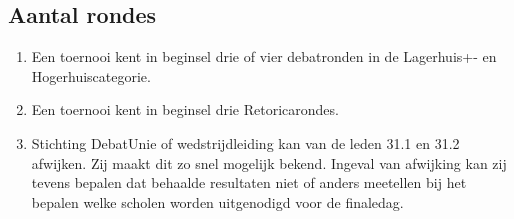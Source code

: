 \subsection{Aantal rondes}

\begin{enumerate}
\item Een toernooi kent in beginsel drie of vier debatronden in de Lagerhuis+- en Hogerhuiscategorie.
\item Een toernooi kent in beginsel drie Retoricarondes. 
\item Stichting DebatUnie of wedstrijdleiding kan van de leden 31.1 en 31.2 afwijken. Zij maakt dit zo snel mogelijk bekend. Ingeval van afwijking kan zij tevens bepalen dat behaalde resultaten niet of anders meetellen bij het bepalen welke scholen worden uitgenodigd voor de finaledag.
\end{enumerate}
